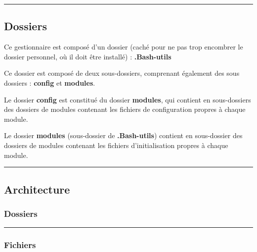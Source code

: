 \documentclass[a4paper,10pt]{article}
\begin{document}
  \color{green}\par\noindent\rule{\textwidth}{0.4pt}\color{white}

  \color{green}
  \subsection{Dossiers}\color{white}
  Ce gestionnaire est composé d'un dossier (caché pour ne pas trop encombrer le dossier personnel, où il doit être installé) : \textbf{\color{lime}.Bash-utils\color{white}}\linebreak
  
  Ce dossier est composé de deux sous-dossiers, comprenant également des sous dossiers : \textbf{\color{lime}config\color{white}} et \textbf{\color{lime}modules\color{white}}.\linebreak

  Le dossier \textbf{\color{lime}config\color{white}} est constitué du dossier \textbf{\color{lime}modules\color{white}}, qui contient en sous-dossiers des dossiers de modules contenant les fichiers de configuration propres à chaque module.\linebreak

  Le dossier \textbf{\color{lime}modules\color{white}} (sous-dossier de \textbf{\color{lime}.Bash-utils\color{white}}) contient en sous-dossier des dossiers de modules contenant les fichiers d'initialisation propres à chaque module.\\[1\baselineskip]



  \color{green}\par\noindent\rule{\textwidth}{0.4pt}\color{white}

  \color{green}
  \subsection{Architecture}\color{white}

  \color{blue}
  \subsubsection{Dossiers}\color{white}



  \color{blue}\par\noindent\rule{\textwidth}{0.4pt}\color{white}
  
  \color{blue}
  \subsubsection{Fichiers}\color{white}
\end{document}
